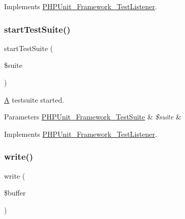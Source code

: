 Implements \mbox{\hyperlink{interface_p_h_p_unit___framework___test_listener_a1a9bddc54f26bb3fb5c2ec9778ea5198}{P\+H\+P\+Unit\+\_\+\+Framework\+\_\+\+Test\+Listener}}.

\mbox{\label{class_p_h_p_unit___util___log___j_s_o_n_a901a86a623d83184267b21f2daee0ff5}} 
\subsubsection{\texorpdfstring{start\+Test\+Suite()}{startTestSuite()}}
{\footnotesize\ttfamily start\+Test\+Suite (\begin{DoxyParamCaption}\item[{\mbox{\hyperlink{class_p_h_p_unit___framework___test_suite}{P\+H\+P\+Unit\+\_\+\+Framework\+\_\+\+Test\+Suite}}}]{\$suite }\end{DoxyParamCaption})}

\mbox{\hyperlink{class_a}{A}} testsuite started.


\begin{DoxyParams}[1]{Parameters}
\mbox{\hyperlink{class_p_h_p_unit___framework___test_suite}{P\+H\+P\+Unit\+\_\+\+Framework\+\_\+\+Test\+Suite}} & {\em \$suite} & \\
\hline
\end{DoxyParams}


Implements \mbox{\hyperlink{interface_p_h_p_unit___framework___test_listener_a901a86a623d83184267b21f2daee0ff5}{P\+H\+P\+Unit\+\_\+\+Framework\+\_\+\+Test\+Listener}}.

\mbox{\label{class_p_h_p_unit___util___log___j_s_o_n_ab3c1b3a323cbbf707c55cc3cd3efd811}} 
\subsubsection{\texorpdfstring{write()}{write()}}
{\footnotesize\ttfamily write (\begin{DoxyParamCaption}\item[{}]{\$buffer }\end{DoxyParamCaption})}


